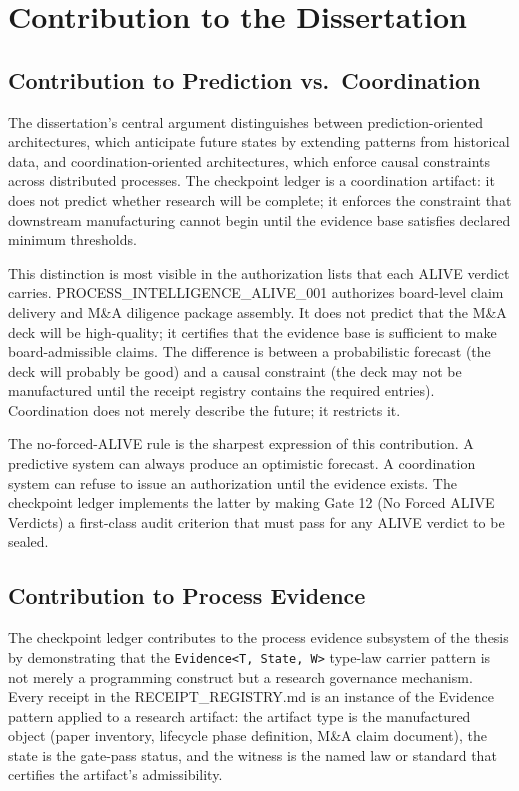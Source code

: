 \section{Contribution to the Dissertation}
\label{sec:checkpoints-contribution}

\subsection{Contribution to Prediction vs.~Coordination}
\label{sec:checkpoints-contribution-prediction-coordination}

The dissertation's central argument distinguishes between prediction-oriented architectures, which
anticipate future states by extending patterns from historical data, and coordination-oriented
architectures, which enforce causal constraints across distributed processes. The checkpoint ledger
is a coordination artifact: it does not predict whether research will be complete; it enforces the
constraint that downstream manufacturing cannot begin until the evidence base satisfies declared
minimum thresholds.

This distinction is most visible in the authorization lists that each ALIVE verdict carries.
PROCESS\_INTELLIGENCE\_ALIVE\_001 authorizes board-level claim delivery and M\&A diligence package
assembly. It does not predict that the M\&A deck will be high-quality; it certifies that the
evidence base is sufficient to make board-admissible claims. The difference is between a
probabilistic forecast (the deck will probably be good) and a causal constraint (the deck may not
be manufactured until the receipt registry contains the required entries). Coordination does not
merely describe the future; it restricts it.

The no-forced-ALIVE rule is the sharpest expression of this contribution. A predictive system can
always produce an optimistic forecast. A coordination system can refuse to issue an authorization
until the evidence exists. The checkpoint ledger implements the latter by making Gate 12
(No Forced ALIVE Verdicts) a first-class audit criterion that must pass for any ALIVE verdict to be
sealed.

\subsection{Contribution to Process Evidence}
\label{sec:checkpoints-contribution-process-evidence}

The checkpoint ledger contributes to the process evidence subsystem of the thesis by demonstrating
that the \texttt{Evidence<T, State, W>} type-law carrier pattern is not merely a programming
construct but a research governance mechanism. Every receipt in the RECEIPT\_REGISTRY.md is an
instance of the Evidence pattern applied to a research artifact: the artifact type is the
manufactured object (paper inventory, lifecycle phase definition, M\&A claim document), the state is
the gate-pass status, and the witness is the named law or standard that certifies the artifact's
admissibility.

